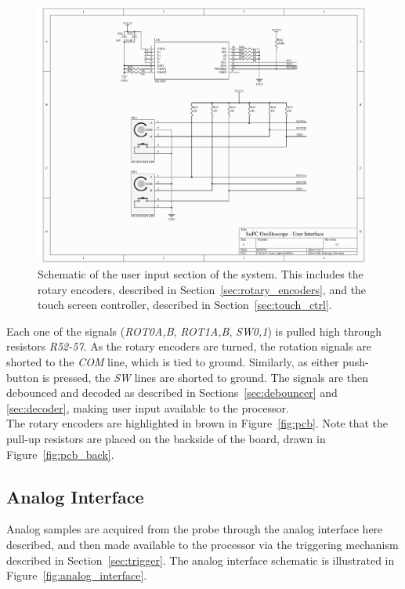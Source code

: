\documentclass[titlepage]{scrartcl}
\begin{document}
	\begin{figure}[h!]
	\vspace{-2cm}
	\centerline{\includegraphics[width=26cm, angle=90, origin=c]{img/user_input.pdf}}
                	\caption{Schematic of the user input section of the system. This includes the rotary encoders, described in Section~\ref{sec:rotary_encoders}, and the touch screen controller, described in Section~\ref{sec:touch_ctrl}.}
               	\label{fig:user_input}
	\end{figure}

	Each one of the signals (\textit{ROT0A,B}, \textit{ROT1A,B}, \textit{SW0,1}) is pulled high through resistors \textit{R52-57}. As the rotary encoders are turned, the rotation signals are shorted to the \textit{COM} line, which is tied to ground. Similarly, as either push-button is pressed, the \textit{SW} lines are shorted to ground. The signals are then debounced and decoded as described in Sections~\ref{sec:debouncer} and \ref{sec:decoder}, making user input available to the processor.\\

	The rotary encoders are highlighted in brown in Figure~\ref{fig:pcb}. Note that the pull-up resistors are placed on the backside of the board, drawn in Figure~\ref{fig:pcb_back}.\\

	\clearpage
	
	\subsection{Analog Interface \label{sec:analog_interface}}
	Analog samples are acquired from the probe through the analog interface here described, and then made available to the processor via the triggering mechanism described in Section~\ref{sec:trigger}. The analog interface schematic is illustrated in Figure~\ref{fig:analog_interface}.\\
\end{document}
